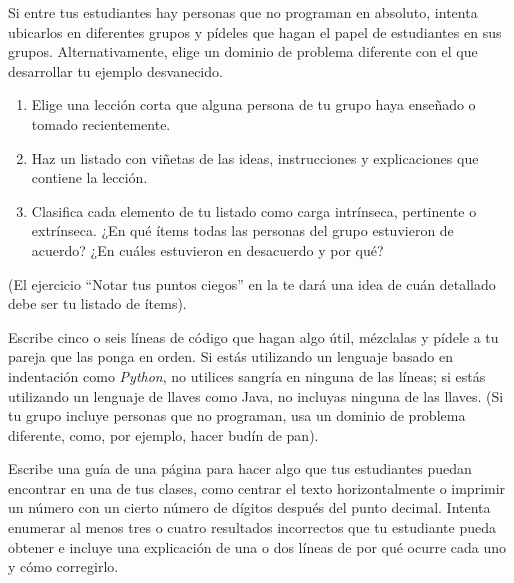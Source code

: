 Si entre tus estudiantes hay personas que no programan en absoluto,
intenta ubicarlos en diferentes grupos
y pídeles que hagan el papel de estudiantes en sus grupos.
Alternativamente,
elige un dominio de problema diferente con el que desarrollar tu ejemplo desvanecido.



\begin{enumerate}

\item
  Elige una lección corta que alguna persona de tu grupo haya enseñado o tomado recientemente.

\item
  Haz un listado con viñetas de las ideas, instrucciones y explicaciones que contiene la lección.

\item
  Clasifica cada elemento de tu listado como carga intrínseca, pertinente o extrínseca.
  ¿En qué ítems todas las personas del grupo estuvieron de acuerdo?
  ¿En cuáles estuvieron en desacuerdo y por qué?

\end{enumerate}

(El ejercicio ``Notar tus puntos ciegos'' en la 
te dará una idea de cuán detallado debe ser tu listado de ítems).



Escribe cinco o seis líneas de código que hagan algo útil,
mézclalas y pídele a tu pareja que las ponga en orden.
Si estás utilizando un lenguaje basado en indentación como \emph{Python},
no utilices sangría en ninguna de las líneas;
si estás utilizando un lenguaje de llaves como Java,
no incluyas ninguna de las llaves.
(Si tu grupo incluye personas que no programan,
usa un dominio de problema diferente,
como, por ejemplo, hacer budín de pan).



Escribe una guía de una página para hacer algo que tus estudiantes puedan encontrar en una de tus clases,
como centrar el texto horizontalmente
o imprimir un número con un cierto número de dígitos después del punto decimal.
Intenta enumerar al menos tres o cuatro resultados incorrectos que tu estudiante pueda obtener
e incluye una explicación de una o dos líneas
de por qué ocurre cada uno y cómo corregirlo.



